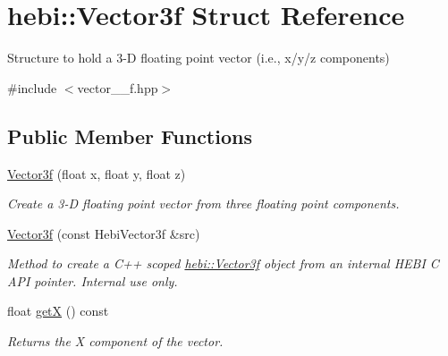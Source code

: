 \hypertarget{structhebi_1_1Vector3f}{}\section{hebi\+:\+:Vector3f Struct Reference}
\label{structhebi_1_1Vector3f}


Structure to hold a 3-\/D floating point vector (i.\+e., x/y/z components)  




{\ttfamily \#include $<$vector\+\_\+\_\+f.\+hpp$>$}

\subsection*{Public Member Functions}
\begin{DoxyCompactItemize}
\item 
\mbox{\label{structhebi_1_1Vector3f_acde62a94c708091af51e133b76423505}} 
\hyperlink{structhebi_1_1Vector3f_acde62a94c708091af51e133b76423505}{Vector3f} (float x, float y, float z)
\begin{DoxyCompactList}\small\item\em Create a 3-\/D floating point vector from three floating point components. \end{DoxyCompactList}\item 
\mbox{\label{structhebi_1_1Vector3f_a7edaecafef5df6250ce2d72c3a9830d8}} 
\hyperlink{structhebi_1_1Vector3f_a7edaecafef5df6250ce2d72c3a9830d8}{Vector3f} (const Hebi\+Vector3f \&src)
\begin{DoxyCompactList}\small\item\em Method to create a C++ scoped \hyperlink{structhebi_1_1Vector3f}{hebi\+::\+Vector3f} object from an internal H\+E\+BI C A\+PI pointer. Internal use only. \end{DoxyCompactList}\item 
\mbox{\label{structhebi_1_1Vector3f_a600d87a6a34df57dfc31d9c3a896ce32}} 
float \hyperlink{structhebi_1_1Vector3f_a600d87a6a34df57dfc31d9c3a896ce32}{getX} () const
\begin{DoxyCompactList}\small\item\em Returns the X component of the vector. \end{DoxyCompactList}\item 

\end{DoxyCompactItemize}

